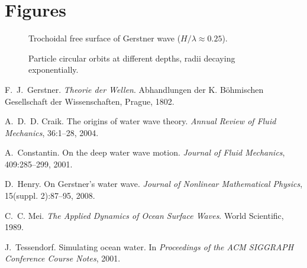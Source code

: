 \documentclass[11pt]{article}
\begin{document}
\section*{Figures}
\begin{figure}[h]
\centering
{}
\caption{Trochoidal free surface of Gerstner wave ($H/\lambda\approx0.25$).}
\end{figure}

\begin{figure}[h]
\centering
{}
\caption{Particle circular orbits at different depths, radii decaying exponentially.}
\end{figure}

\newpage

\begin{thebibliography}{99}

F.~J.~Gerstner. \emph{Theorie der Wellen}. Abhandlungen der K. B\"ohmischen Gesellschaft der Wissenschaften, Prague, 1802.

A.~D.~D. Craik. The origins of water wave theory. \emph{Annual Review of Fluid Mechanics}, 36:1--28, 2004.

A.~Constantin. On the deep water wave motion. \emph{Journal of Fluid Mechanics}, 409:285--299, 2001.

D.~Henry. On Gerstner’s water wave. \emph{Journal of Nonlinear Mathematical Physics}, 15(suppl. 2):87--95, 2008.

C.~C. Mei. \emph{The Applied Dynamics of Ocean Surface Waves}. World Scientific, 1989.

J.~Tessendorf. Simulating ocean water. In \emph{Proceedings of the ACM SIGGRAPH Conference Course Notes}, 2001.

\end{thebibliography}
\end{document}
